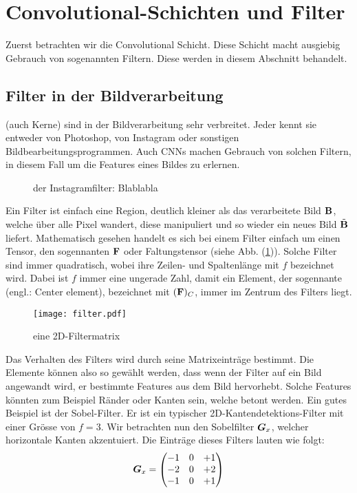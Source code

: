 \para{}
\cite{Goodfellow-et-al-2016}
\cite{deeplearning.ai:cnn}
\cite{wiki:cnn}


\section{Convolutional-Schichten und Filter}
Zuerst betrachten wir die Convolutional Schicht. Diese Schicht macht ausgiebig
Gebrauch von sogenannten Filtern. Diese werden in diesem Abschnitt behandelt.

\subsection{Filter in der Bildverarbeitung}
 (auch Kerne) sind in der Bildverarbeitung sehr verbreitet. Jeder kennt sie entweder
von Photoshop, von Instagram oder sonstigen Bildbearbeitungsprogrammen.
Auch CNNs machen Gebrauch von solchen Filtern, in diesem Fall um die Features eines Bildes zu
erlernen.
\begin{figure}[h!]

  \caption{der Instagramfilter: Blablabla}
\end{figure}

\para{}
Ein Filter ist einfach eine Region, deutlich kleiner als das verarbeitete Bild
$\mathbf{B}$, welche
über alle Pixel wandert, diese manipuliert und so wieder ein neues Bild
$\tilde{\mathbf{B}}$ liefert.
Mathematisch gesehen handelt es sich bei einem Filter einfach um einen Tensor,
den sogennanten  $\mathbf{F}$ oder Faltungstensor (siehe Abb.
(\ref{fig:filtermatrix})). Solche Filter sind immer quadratisch, wobei ihre
Zeilen- und Spaltenlänge mit $f$ bezeichnet wird. Dabei ist $f$ immer eine ungerade Zahl, damit ein
Element, der sogennante  (engl.: Center element), bezeichnet mit $(\mathbf{F})_C$,
immer im Zentrum des Filters liegt. \\

\begin{figure}[h!]
  \centering
  \texttt{[image: filter.pdf]}
  \caption{eine 2D-Filtermatrix}
  \label{fig:filtermatrix}
\end{figure}
\para{}
Das Verhalten des Filters wird durch seine Matrixeinträge bestimmt.
Die Elemente können also so gewählt werden, dass wenn der Filter auf ein Bild
angewandt wird, er bestimmte Features aus dem Bild hervorhebt. Solche Features
könnten zum Beispiel Ränder oder Kanten sein, welche betont werden.
\para{}
Ein gutes Beispiel ist der Sobel-Filter. Er ist ein typischer 2D-Kantendetektions-Filter mit einer
Grösse von $f = 3$. Wir betrachten nun den Sobelfilter $\bm{G}_x$, welcher
horizontale Kanten akzentuiert. Die Einträge dieses Filters lauten wie folgt:
\begin{equation*}
  \bm{G}_x =
  \begin{pmatrix}
    -1 & 0 & +1 \\
    -2 & 0 & +2 \\
    -1 & 0 & +1 \\
  \end{pmatrix}
\end{equation*}

